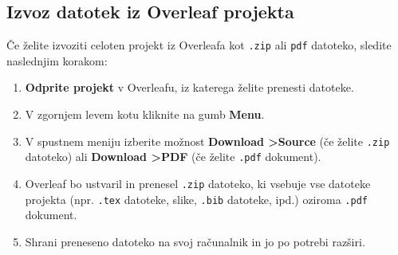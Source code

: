 \subsection{Izvoz datotek iz Overleaf projekta}

Če želite izvoziti celoten projekt iz Overleafa kot \texttt{.zip} ali \texttt{pdf} datoteko, sledite naslednjim korakom:

\begin{enumerate}
\item \textbf{Odprite projekt} v Overleafu, iz katerega želite prenesti datoteke.
\item V zgornjem levem kotu kliknite na gumb \textbf{Menu}.
\item V spustnem meniju izberite možnost \textbf{Download \textgreater  Source} (če želite \texttt{.zip} datoteko) ali \textbf{Download \textgreater  PDF} (če želite \texttt{.pdf} dokument).
\item Overleaf bo ustvaril in prenesel \texttt{.zip} datoteko, ki vsebuje vse datoteke projekta (npr. \texttt{.tex} datoteke, slike, \texttt{.bib} datoteke, ipd.) oziroma \texttt{.pdf} dokument.
\item Shrani preneseno datoteko na svoj računalnik in jo po potrebi razširi.
\end{enumerate}